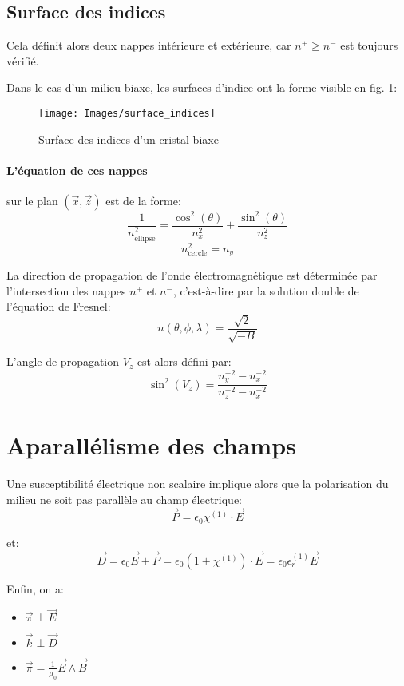 \documentclass[a4paper,11pt]{report}
\begin{document}
\subsection{Surface des indices}
Cela définit alors deux nappes intérieure et extérieure, car $n^+ \geq n^-$ est toujours vérifié.

Dans le cas d'un milieu biaxe, les surfaces d'indice ont la forme visible en fig. \ref{surf_indices}:

\begin{figure}[h]
    \begin{center}
        \texttt{[image: Images/surface\_indices]}
        \caption{Surface des indices d'un cristal biaxe}
        \label{surf_indices}
    \end{center}
\end{figure}

\paragraph{L'équation de ces nappes} sur le plan $(\vec x, \vec z)$ est de la forme:
\[  \frac{1}{n^2_\text{ellipse}} = \frac{\cos^2(\theta)}{n^2_x} + \frac{\sin^2(\theta)}{n^2_z} \]
\[  n^2_\text{cercle} = n_y \]

La direction de propagation de l'onde électromagnétique est déterminée par l'intersection des nappes $n^+$ et $n^-$, c'est-à-dire par la solution double de l'équation de Fresnel:
\[  n(\theta, \phi, \lambda) = \dfrac{\sqrt 2}{\sqrt{-B}} \]

L'angle de propagation $V_z$ est alors défini par:
\[ \sin^2(V_z) = \frac{n_y^{-2}-n_x^{-2}}{n_z^{-2}-n_x^{-2}} \]


\section{Aparallélisme des champs}
Une susceptibilité électrique non scalaire implique alors que la polarisation du milieu ne soit pas parallèle au champ électrique:
\[\vec{P} = \epsilon_0 \chi^{(1)} \cdot\vec{E}\]

et: 
\[\vec{D} = \epsilon_0 \vec{E} + \vec{P}
          = \epsilon_0 (1+\chi^{(1)}) \cdot\vec{E}
          = \epsilon_0 \epsilon_r^{(1)} \vec{E}\]

Enfin, on a:
\begin{itemize}
    \item $\vec{\pi} \perp \vec{E}$
    \item $\vec{k}   \perp \vec{D}$
    \item $\vec{\pi} = \frac{1}{\mu_0} \vec{E}\wedge \vec{B}$
\end{itemize}
\end{document}
